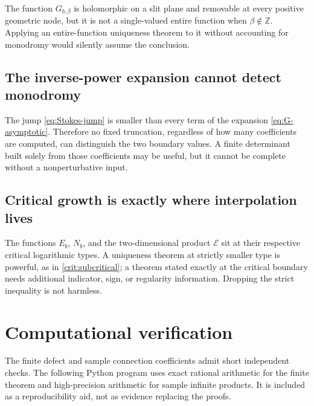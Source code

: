 \documentclass[11pt]{article}
\theoremstyle{definition}
\newcommand{\EE}{\mathcal{E}}
\newcommand{\Z}{\mathbb{Z}}
\begin{document}
The function $G_{b,\beta}$ is holomorphic on a slit plane and removable at every positive geometric node, but it is not a single-valued entire function when $\beta\notin\Z$.  Applying an entire-function uniqueness theorem to it without accounting for monodromy would silently assume the conclusion.

\subsection{The inverse-power expansion cannot detect monodromy}

The jump \eqref{eq:Stokes-jump} is smaller than every term of the expansion \eqref{eq:G-asymptotic}.  Therefore no fixed truncation, regardless of how many coefficients are computed, can distinguish the two boundary values.  A finite determinant built solely from those coefficients may be useful, but it cannot be complete without a nonperturbative input.

\subsection{Critical growth is exactly where interpolation lives}

The functions $E_b$, $N_b$, and the two-dimensional product $\EE$ sit at their respective critical logarithmic types.  A uniqueness theorem at strictly smaller type is powerful, as in \cref{crit:subcritical}; a theorem stated exactly at the critical boundary needs additional indicator, sign, or regularity information.  Dropping the strict inequality is not harmless.

\section{Computational verification}

The finite defect and sample connection coefficients admit short independent checks.  The
following Python program uses exact rational arithmetic for the finite theorem and
high-precision arithmetic for sample infinite products.  It is included as a reproducibility
aid, not as evidence replacing the proofs.
\end{document}
